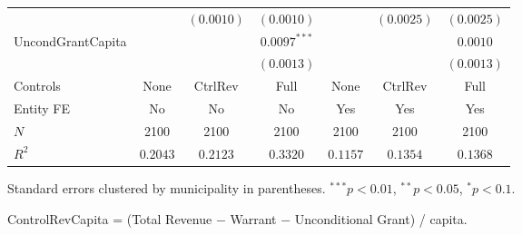 \documentclass[border=10pt,varwidth=25cm]{standalone}
\renewenvironment{table}[1][]{}{}
\begin{document}
\begin{table}[H]
\begin{minipage}{\textwidth}
\begin{tabular}{lcccccc}
         &  & $(0.0010)$ & $(0.0010)$ &  & $(0.0025)$ & $(0.0025)$ \\[4pt]
        UncondGrantCapita &  &  & $0.0097^{***}$ &  &  & $0.0010$ \\
         &  &  & $(0.0013)$ &  &  & $(0.0013)$ \\[4pt]
        \midrule
        Controls & None & CtrlRev & Full & None & CtrlRev & Full \\
        Entity FE & No & No & No & Yes & Yes & Yes \\
        $N$ & 2100 & 2100 & 2100 & 2100 & 2100 & 2100 \\
        $R^2$ & $0.2043$ & $0.2123$ & $0.3320$ & $0.1157$ & $0.1354$ & $0.1368$ \\
        \bottomrule
    \end{tabular}

    \vspace{6pt}
    {\scriptsize Standard errors clustered by municipality in parentheses. $^{***}p<0.01$, $^{**}p<0.05$, $^{*}p<0.1$.}

    {\scriptsize ControlRevCapita = (Total Revenue $-$ Warrant $-$ Unconditional Grant) / capita.}
    \end{minipage}
\end{table}
\end{document}
